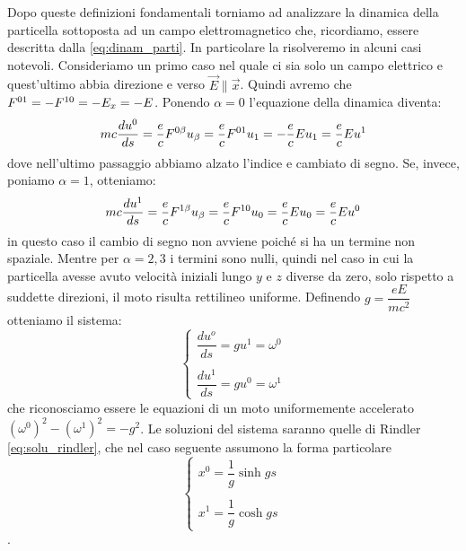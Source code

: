   Dopo queste definizioni fondamentali torniamo ad analizzare la dinamica della particella sottoposta ad un campo elettromagnetico che, ricordiamo, essere descritta dalla \eqref{eq:dinam_parti}. In particolare la risolveremo in alcuni casi notevoli. 
  Consideriamo un primo caso nel quale ci sia solo un campo elettrico e quest'ultimo abbia direzione e verso $\Vec{E}\parallel\Vec{x}$. Quindi avremo che $F\indices{^{01}}=-F\indices{^{10}}=-E_x=-E$. Ponendo $\alpha=0$ l'equazione della dinamica diventa:
  \begin{equation}
    mc\dfrac{du^0}{ds}=\dfrac{e}{c}F\indices{^{0\beta}}u_\beta=\dfrac{e}{c}F\indices{^{01}}u_1=-\dfrac{e}{c}Eu_1=\dfrac{e}{c}Eu^1
\end{equation}
dove nell'ultimo passaggio abbiamo alzato l'indice e cambiato di segno.
Se, invece, poniamo $\alpha=1$, otteniamo: 
\begin{equation}
    mc\dfrac{du^1}{ds}=\dfrac{e}{c}F\indices{^{1\beta}}u_\beta=\dfrac{e}{c}F\indices{^{10}}u_0=\dfrac{e}{c}Eu_0=\dfrac{e}{c}Eu^0
\end{equation}
in questo caso il cambio di segno non avviene poiché si ha un termine non spaziale. Mentre per $\alpha=2,3$ i termini sono nulli, quindi nel caso in cui la particella avesse avuto velocità iniziali lungo $y$ e $z$ diverse da zero, solo rispetto a suddette direzioni, il moto risulta rettilineo uniforme. Definendo $g=\dfrac{eE}{mc^2}$ otteniamo il sistema:
\begin{equation}
   \begin{cases}
    \dfrac{du^o}{ds}=gu^1=\omega^0
    \\
    \\
    \dfrac{du^1}{ds}=gu^0=\omega^1
      \end{cases}
\end{equation}
che riconosciamo essere le equazioni di un moto uniformemente accelerato $(\omega^0)^2-(\omega^1)^2=-g^2$. Le soluzioni del sistema saranno quelle di Rindler \eqref{eq:solu_rindler}, che nel caso seguente assumono la forma particolare 
\begin{equation}
   \begin{cases}
      x^0=\dfrac{1}{g}\sinh{gs}
      \\
      \\
     x^1=\dfrac{1}{g}\cosh{gs}
      \end{cases}\, 
\end{equation}.

